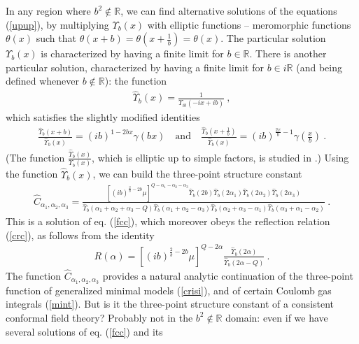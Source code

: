 \documentclass[12pt,a4paper,notitlepage]{report}
\newcommand \R {\mathbb{R}}
\numberwithin{equation}{section}
\theoremstyle{break}
\begin{document}
In any region where $b^2\notin\R$, we can find alternative solutions of the equations (\ref{upup}), by multiplying $\Upsilon_b(x)$ with elliptic functions -- meromorphic functions $\theta(x)$ such that $\theta(x+b)=\theta(x+\frac{1}{b}) = \theta(x)$. The particular solution $\Upsilon_b(x)$ is characterized by having a finite limit for $b\in \R$. 
There is another particular solution, characterized by having a finite limit for $b\in i\R$ (and being defined whenever $b\notin\R$): the function 
\begin{align}
 \hat{\Upsilon}_b(x) = \frac{1}{\Upsilon_{ib}(-ix+ib)}\ ,
\label{tub}
\end{align}
which satisfies the slightly modified identities
 \begin{align}
 \frac{\hat{\Upsilon}_b(x+b)}{\hat{\Upsilon}_b(x)} = (ib)^{1-2bx} \gamma(bx)\quad \text{and} \quad \frac{\hat{\Upsilon}_b(x+\frac{1}{b})}{\hat{\Upsilon}_b(x)} = (ib)^{\frac{2x}{b}-1} \gamma(\tfrac{x}{b})\ .
\end{align}
(The function $\frac{\hat{\Upsilon}_b(x)}{\Upsilon_b(x)}$, which is elliptic up to simple factors, is studied in \cite{zam05}.)
Using the function $\hat{\Upsilon}_b(x)$, we can build the three-point structure constant
\begin{align}
 \hat{C}_{\alpha_1,\alpha_2,\alpha_3} =  \frac{\left[(ib)^{\frac{2}{b}-2b}\mu\right]^{Q-\alpha_1-\alpha_2-\alpha_3}\hat{\Upsilon}_b(2b) \hat{\Upsilon}_b(2\alpha_1) \hat{\Upsilon}_b(2\alpha_2) \hat{\Upsilon}_b(2\alpha_3)}{\hat{\Upsilon}_b(\alpha_1+\alpha_2+\alpha_3-Q) \hat{\Upsilon}_b(\alpha_1+\alpha_2-\alpha_3)\hat{\Upsilon}_b(\alpha_2+\alpha_3-\alpha_1)\hat{\Upsilon}_b(\alpha_3+\alpha_1-\alpha_2)} \ .
\label{hc}
\end{align}
This is a solution of eq. (\ref{fcc}), which moreover obeys 
the reflection relation (\ref{crc}), as follows from the identity
\begin{align}
 R(\alpha)=\left[(ib)^{\frac{2}{b}-2b}\mu\right]^{Q-2\alpha}\frac{\hat{\Upsilon}_b(2\alpha)}{\hat{\Upsilon}_b(2\alpha-Q)}\ .
\end{align}
The function $\hat{C}_{\alpha_1,\alpha_2,\alpha_3}$ provides a natural analytic continuation of the three-point function of generalized minimal models (\ref{crisi}), and of certain Coulomb gas integrals (\ref{mint}). But is it the three-point structure constant of a consistent conformal field theory? Probably not in the $b^2\notin\R$ domain: even if we have several solutions of eq. (\ref{fcc}) and its 
\end{document}
